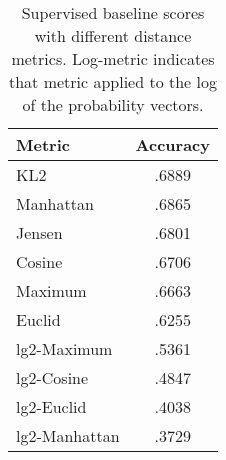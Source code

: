 \begin{table}[h] \centering
\caption{Supervised baseline scores with different distance metrics.
  Log-metric indicates that metric applied to the log of the
  probability vectors.}
\begin{tabular}{|l|c|}
\hline
Metric & Accuracy \\
\hline
KL2 & .6889 \\
Manhattan & .6865 \\
Jensen & .6801 \\
Cosine & .6706 \\
Maximum & .6663 \\
Euclid & .6255 \\
lg2-Maximum & .5361 \\
lg2-Cosine & .4847 \\
lg2-Euclid & .4038 \\
lg2-Manhattan & .3729 \\
\hline
\end{tabular}
\label{tab:distscores}
\end{table}

